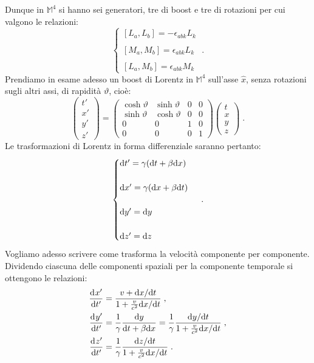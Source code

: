 Dunque in $\mathbb{M}^4$ si hanno sei generatori, tre di boost e tre di rotazioni per cui valgono le relazioni:
\begin{equation}
\begin{cases}
[L_a,L_b]=-\epsilon_{abk}L_k \\
\\
[M_a,M_b]=\epsilon_{abk}L_k \\
\\
[L_a,M_b]=\epsilon_{abk}M_k
\end{cases}\;.
\end{equation}
Prendiamo in esame adesso un boost di Lorentz in $\mathbb{M}^4$ sull'asse $\hat{x}$, senza rotazioni sugli altri assi, di rapidità $
\vartheta$, cioè:
\begin{equation}
\begin{pmatrix}
t' \\
x' \\
y' \\
z'
\end{pmatrix}= \begin{pmatrix}
\cosh\vartheta & \sinh\vartheta & 0 & 0 \\
\sinh\vartheta & \cosh\vartheta & 0 & 0 \\
0 & 0 & 1 & 0 \\
0 & 0 & 0 & 1
\end{pmatrix}\begin{pmatrix}
t \\
x \\
y \\
z
\end{pmatrix}\;.
\end{equation}
Le trasformazioni di Lorentz in forma differenziale saranno pertanto:
\begin{equation}
\begin{cases}
\mathrm{d}{t'}=\gamma(\mathrm{d}{t}+\beta\mathrm{d}{x}) \\
\\
\mathrm{d}{x'}=\gamma(\mathrm{d}{x}+\beta\mathrm{d}{t}) \\
\\
\mathrm{d}{y'}=\mathrm{d}{y} \\
\\
\mathrm{d}{z'}=\mathrm{d}{z}
\end{cases}\;.
\end{equation}
Vogliamo adesso scrivere come trasforma la velocità componente per componente. Dividendo ciascuna delle componenti spaziali per la 
componente temporale si ottengono le relazioni:
\begin{align}
\frac{\mathrm{d}^{}x'}{\mathrm{d}t'^{}} &= \frac{v+\mathrm{d}{x}/\mathrm{d}{t}}{1+\frac{v}{c^2}\mathrm{d}{x}/\mathrm{d}{t}}\;, \\
\frac{\mathrm{d}^{}y'}{\mathrm{d}t'^{}} &= \frac{1}{\gamma}\frac{\mathrm{d}{y}}{\mathrm{d}{t}+\beta\mathrm{d}{x}}=\frac{1}{\gamma}\frac{\mathrm{d}{y}/\mathrm{d}{t}}{1+\frac{v}{c^2}\mathrm{d}{x}/\mathrm{d}{t}}\;, \\
\frac{\mathrm{d}^{}z'}{\mathrm{d}t'^{}} &= \frac{1}{\gamma}\frac{\mathrm{d}{z}/\mathrm{d}{t}}{1+\frac{v}{c^2}\mathrm{d}{x}/\mathrm{d}{t}}\;.
\end{align}

